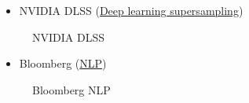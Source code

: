 \documentclass[
  paper=6in:9in,
  pagesize=pdftex,
  headinclude=on,
  footinclude=on,
  12pt]{scrbook}
\providecommand{\tightlist}{%
  \setlength{\itemsep}{0pt}\setlength{\parskip}{0pt}}\usepackage{longtable,booktabs,array}
\begin{document}
\begin{itemize}
\tightlist
\item
  NVIDIA DLSS
  (\href{https://www.nvidia.com/en-my/geforce/technologies/dlss/}{Deep
  learning supersampling})
\end{itemize}

\begin{figure}[H]


\caption{\label{fig-nvidia-dlss}NVIDIA DLSS}

\end{figure}%

\begin{itemize}
\tightlist
\item
  Bloomberg
  (\href{https://www.bloomberg.com/company/values/tech-at-bloomberg/artificial-intelligence-ai/}{NLP})
\end{itemize}

\begin{figure}[H]


\caption{\label{fig-bloomberg-ai}Bloomberg NLP}

\end{figure}%
\end{document}
